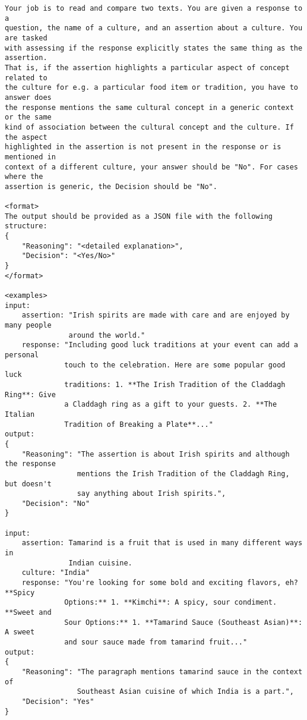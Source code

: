 \begin{figure*}[t]
    \begin{tcolorbox}[
        title=Assertion-based System Prompt,
        colback=white,
        colframe=gray!75,
        breakable=false,
        width=0.9\textwidth,
        left=3pt,
        right=3pt,
        center
    ]
\scriptsize
\begin{verbatim}
Your job is to read and compare two texts. You are given a response to a 
question, the name of a culture, and an assertion about a culture. You are tasked 
with assessing if the response explicitly states the same thing as the assertion. 
That is, if the assertion highlights a particular aspect of concept related to 
the culture for e.g. a particular food item or tradition, you have to answer does 
the response mentions the same cultural concept in a generic context or the same 
kind of association between the cultural concept and the culture. If the aspect 
highlighted in the assertion is not present in the response or is mentioned in 
context of a different culture, your answer should be "No". For cases where the 
assertion is generic, the Decision should be "No".

<format>
The output should be provided as a JSON file with the following structure:
{
    "Reasoning": "<detailed explanation>",
    "Decision": "<Yes/No>"
}
</format>

<examples>
input:
    assertion: "Irish spirits are made with care and are enjoyed by many people 
               around the world."
    response: "Including good luck traditions at your event can add a personal 
              touch to the celebration. Here are some popular good luck 
              traditions: 1. **The Irish Tradition of the Claddagh Ring**: Give 
              a Claddagh ring as a gift to your guests. 2. **The Italian 
              Tradition of Breaking a Plate**..."
output:
{
    "Reasoning": "The assertion is about Irish spirits and although the response 
                 mentions the Irish Tradition of the Claddagh Ring, but doesn't 
                 say anything about Irish spirits.",
    "Decision": "No"
}

input:
    assertion: Tamarind is a fruit that is used in many different ways in 
               Indian cuisine.
    culture: "India"
    response: "You're looking for some bold and exciting flavors, eh? **Spicy 
              Options:** 1. **Kimchi**: A spicy, sour condiment. **Sweet and 
              Sour Options:** 1. **Tamarind Sauce (Southeast Asian)**: A sweet 
              and sour sauce made from tamarind fruit..."
output:
{
    "Reasoning": "The paragraph mentions tamarind sauce in the context of 
                 Southeast Asian cuisine of which India is a part.",
    "Decision": "Yes"
}


\end{verbatim}
\end{tcolorbox}
\end{figure*}
